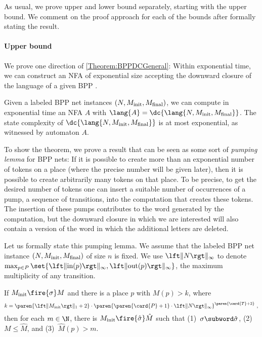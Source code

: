 \documentclass[../../diss.tex]{subfiles}
\begin{document}
As usual, we prove upper and lower bound separately, starting with the upper bound.
We comment on the proof approach for each of the bounds after formally stating the result.

\paragraph{Upper bound}

We prove one direction of \cref{Theorem:BPPDCGeneral}:
Within exponential time, we can construct an NFA of exponential size accepting the downward closure of the language of a given BPP .

%
\cheatpagebreak
%

\begin{theorem}%
\label{Theorem:BPPDC}%
    Given a labeled BPP net instances $(N,M_{\text{init}},M_{\text{final}})$, we can compute in exponential time an NFA $A$ with $\lang{A} = \dc{\lang{N,\Minit,\Mfinal}}$.
    The state complexity of $\dc{\lang{N,\Minit,\Mfinal}}$ is at most exponential, as witnessed by automaton $A$.
\end{theorem}

To show the theorem, we prove a result that can be seen as some sort of \emph{pumping lemma} for BPP nets:
If it is possible to create more than an exponential number of tokens on a place (where the precise number will be given later), then it is possible to create arbitrarily many tokens on that place.
To be precise, to get the desired number of tokens one can insert a suitable number of occurrences of a pump, a sequence of transitions, into the computation that creates these tokens.
The insertion of these pumps contributes to the word generated by the computation, but the downward closure in which we are interested will also contain a version of the word in which the additional letters are deleted.

Let us formally state this pumping lemma.
We assume that the labeled BPP net instance $(N,M_{\text{init}},M_{\text{final}})$ of size $n$ is fixed.
We use $\norminf{N}$ to denote $\max_{p \in P} \set{ \norminf{\i(p)}, \norminf{\o(p)}}$, the maximum multiplicity of any transition.

\begin{lemma}%
\label{Lemma:BPPPumping}%
     If $\Minit \fire{\sigma} M$ and there is a place $p$ with $M(p) > k$, where
     \[
         k = \paren{\normone{\Minit}+2} \cdot \paren{ \paren{\card{P}+1} \cdot \norminf{N}}^{ \paren{\card{T} + 2} }
         \ ,
     \]
     then for each $m \in \N$, there is $\Minit \fire{\hat{\sigma}} \hat{M}$ such that
     (1)~$\sigma \subword \hat{\sigma}$,
     (2)~$M \leq \hat{M}$, and
     (3)~$\hat{M}(p) > m$.
\end{lemma}
\end{document}
